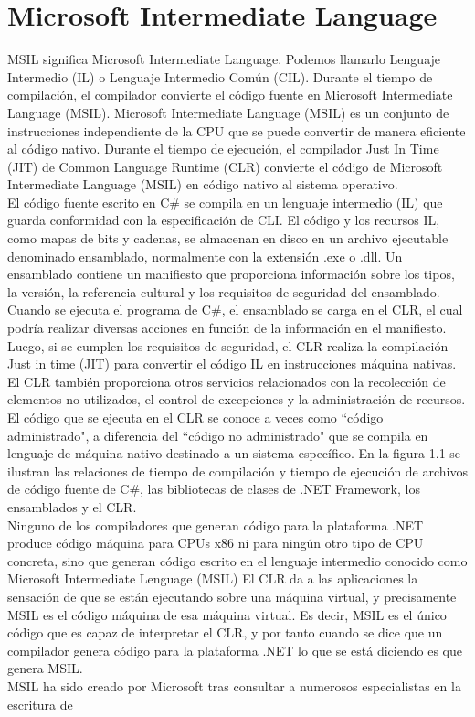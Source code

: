 \documentclass[12pt,a4paper]{report}
\begin{document}
\section{Microsoft Intermediate Language}
MSIL significa Microsoft Intermediate Language. Podemos llamarlo Lenguaje Intermedio (IL) o Lenguaje Intermedio Común (CIL). Durante el tiempo de compilación, el compilador convierte el código fuente en Microsoft Intermediate Language (MSIL). Microsoft Intermediate Language (MSIL) es un conjunto de instrucciones independiente de la CPU que se puede convertir de manera eficiente al código nativo. Durante el tiempo de ejecución, el compilador Just In Time (JIT) de Common Language Runtime (CLR) convierte el código de Microsoft Intermediate Language (MSIL) en código nativo al sistema operativo.\\El código fuente escrito en C\# se compila en un lenguaje intermedio (IL) que guarda conformidad con la especificación de CLI. El código y los recursos IL, como mapas de bits y cadenas, se almacenan en disco en un archivo ejecutable denominado ensamblado, normalmente con la extensión .exe o .dll. Un ensamblado contiene un manifiesto que proporciona información sobre los tipos, la versión, la referencia cultural y los requisitos de seguridad del ensamblado.\\Cuando se ejecuta el programa de C\#, el ensamblado se carga en el CLR, el cual podría realizar diversas acciones en función de la información en el manifiesto. Luego, si se cumplen los requisitos de seguridad, el CLR realiza la compilación Just in time (JIT) para convertir el código IL en instrucciones máquina nativas. El CLR también proporciona otros servicios relacionados con la recolección de elementos no utilizados, el control de excepciones y la administración de recursos. El código que se ejecuta en el CLR se conoce a veces como ``código administrado", a diferencia del ``código no administrado" que se compila en lenguaje de máquina nativo destinado a un sistema específico. En la figura 1.1 se ilustran las relaciones de tiempo de compilación y tiempo de ejecución de archivos de código fuente de C\#, las bibliotecas de clases de .NET Framework, los ensamblados y el CLR.\\Ninguno de los compiladores que generan código para la plataforma .NET produce código máquina para CPUs x86 ni para ningún otro tipo de CPU concreta, sino que generan código escrito en el lenguaje intermedio conocido como Microsoft Intermediate Lenguage (MSIL) El CLR da a las aplicaciones la sensación de que se están ejecutando sobre una máquina virtual, y precisamente MSIL es el código máquina de esa máquina virtual. Es decir, MSIL es el único código que es capaz de interpretar el CLR, y por tanto cuando se dice que un compilador genera código para la plataforma .NET lo que se está diciendo es que genera MSIL.\\MSIL ha sido creado por Microsoft tras consultar a numerosos especialistas en la escritura de 
\end{document}
